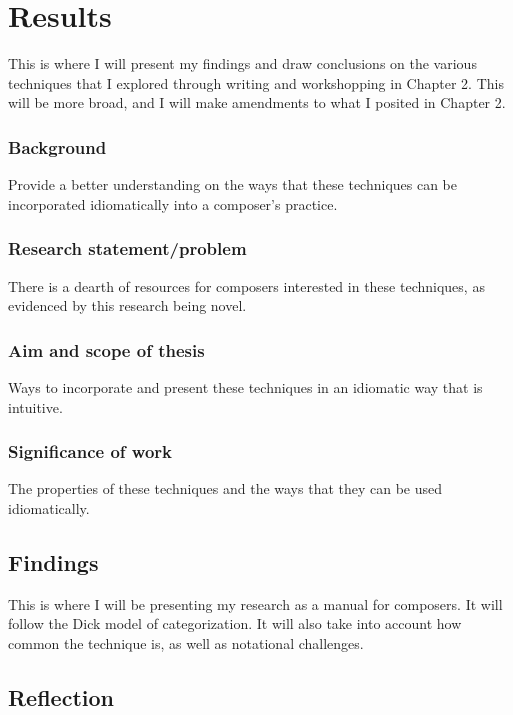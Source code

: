 
\chapter{Results}
This is where I will present my findings and draw conclusions on the various techniques that I explored through writing and workshopping in Chapter 2. This will be more broad, and I will make amendments to what I posited in Chapter 2. \lipsum[5]
\subsection{Background}
Provide a better understanding on the ways that these techniques can be incorporated idiomatically into a composer's practice.

\subsection{Research statement/problem}
There is a dearth of resources for composers interested in these techniques, as evidenced by this research being novel.

\subsection{Aim and scope of thesis}
Ways to incorporate and present these techniques in an idiomatic way that is intuitive.

\subsection{Significance of work}
The properties of these techniques and the ways that they can be used idiomatically.


\lipsum[4]

\section{Findings}
This is where I will be presenting my research as a manual for composers. It will follow the Dick model of categorization.\autocite{dickOtherFlute1989} It will also take into account how common the technique is, as well as notational challenges. \lipsum[5]

\section{Reflection}
\lipsum[4]

\lipsum[5]

\lipsum[4]